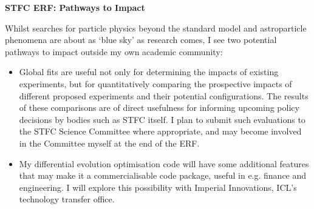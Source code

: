 \documentclass[11pt,a4paper]{article}
\author{Pat Scott}
\begin{document}
\thispagestyle{fancy}

\centerline{\textbf{STFC ERF: Pathways to Impact}}\bigskip 

Whilst searches for particle physics beyond the standard model and astroparticle phenomena are about as `blue sky' as research comes, I see two potential pathways to impact outside my own academic community:
\begin{itemize}
\item Global fits are useful not only for determining the impacts of existing experiments, but for quantitatively comparing the prospective impacts of different proposed experiments and their potential configurations.  The results of these comparisons are of direct usefulness for informing upcoming policy decisions by bodies such as STFC itself.  I plan to submit such evaluations to the STFC Science Committee where appropriate, and may become involved in the Committee myself at the end of the ERF.
\item My differential evolution optimisation code will have some additional features that may make it a commercialisable code package, useful in e.g. finance and engineering.  I will explore this possibility with Imperial Innovations, ICL's technology transfer office.
\end{itemize}
\end{document}
